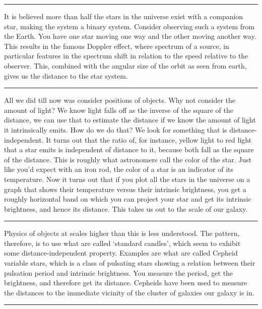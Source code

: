 \documentclass[11pt]{article}
\begin{document}
\noindent\rule[0.5ex]{\linewidth}{1pt}

\noindent It is believed more than half the stars in the universe exist with a companion star, making the system a binary system. Consider observing such a system from the Earth. You have one star moving one way and the other moving another way. This results in the famous Doppler effect, where spectrum of a source, in particular features in the spectrum shift in relation to the speed relative to the observer. This, combined with the angular size of the orbit as seen from earth, gives us the distance to the star system.

\noindent\rule[0.5ex]{\linewidth}{1pt}

\noindent All we did till now was consider positions of objects. Why not consider the amount of light? We know light falls off as the inverse of the square of the distance, we can use that to estimate the distance if we know the amount of light it intrinsically emits. How do we do that? We look for something that is distance-independent. It turns out that the ratio of, for instance, yellow light to red light that a star emits is independent of distance to it, because both fall as the square of the distance. This is roughly what astronomers call the color of the star. Just like you'd expect with an iron rod, the color of a star is an indicator of its temperature. Now it turns out that if you plot all the stars in the universe on a graph that shows their temperature versus their intrinsic brightness, you get a roughly horizontal band on which you can project your star and get its intrinsic brightness, and hence its distance.  This takes us out to the scale of our galaxy.

\noindent\rule[0.5ex]{\linewidth}{1pt}

\noindent Physics of objects at scales higher than this is less understood. The pattern, therefore, is to use what are called `standard candles', which seem to exhibit some distance-independent property. Examples are what are called Cepheid variable stars, which is a class of pulsating stars showing a relation between their pulsation period and intrinsic brightness. You measure the period, get the brightness, and therefore get its distance. Cepheids have been used to measure the distances to the immediate vicinity of the cluster of galaxies our galaxy is in.

\noindent\rule[0.5ex]{\linewidth}{1pt}
\end{document}
